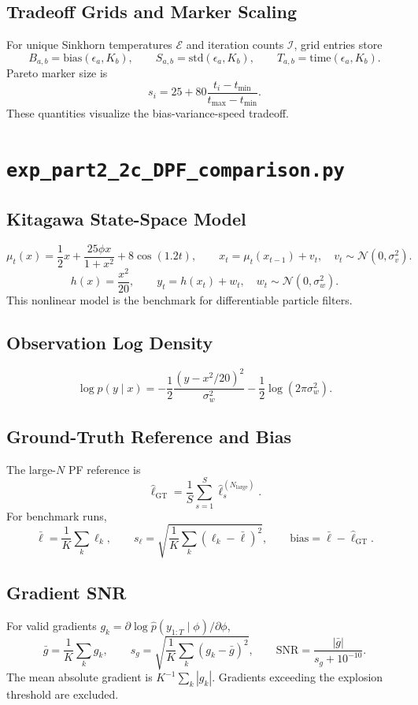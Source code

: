 \documentclass[11pt]{article}
\newcommand{\code}[1]{\texttt{#1}}
\begin{document}
\subsection*{Tradeoff Grids and Marker Scaling}
For unique Sinkhorn temperatures \(\mathcal E\) and iteration counts \(\mathcal I\), grid entries store
\[
B_{a,b}=\mathrm{bias}(\epsilon_a,K_b),\qquad
S_{a,b}=\mathrm{std}(\epsilon_a,K_b),\qquad
T_{a,b}=\mathrm{time}(\epsilon_a,K_b).
\]
Pareto marker size is
\[
s_i=25+80\frac{t_i-t_{\min}}{t_{\max}-t_{\min}}.
\]
These quantities visualize the bias-variance-speed tradeoff.

\section{\code{exp\_part2\_2c\_DPF\_comparison.py}}
\subsection*{Kitagawa State-Space Model}
\[
\mu_t(x)=\frac12x+\frac{25\phi x}{1+x^2}+8\cos(1.2t),
\qquad
x_t=\mu_t(x_{t-1})+v_t,\quad v_t\sim\mathcal N(0,\sigma_v^2).
\]
\[
h(x)=\frac{x^2}{20},\qquad
y_t=h(x_t)+w_t,\quad w_t\sim\mathcal N(0,\sigma_w^2).
\]
This nonlinear model is the benchmark for differentiable particle filters.

\subsection*{Observation Log Density}
\[
\log p(y\mid x)
=-\frac12\frac{(y-x^2/20)^2}{\sigma_w^2}
-\frac12\log(2\pi\sigma_w^2).
\]

\subsection*{Ground-Truth Reference and Bias}
The large-\(N\) PF reference is
\[
\hat\ell_{\mathrm{GT}}=\frac{1}{S}\sum_{s=1}^{S}\hat\ell_s^{(N_{\mathrm{large}})}.
\]
For benchmark runs,
\[
\bar\ell=\frac{1}{K}\sum_k\ell_k,\qquad
s_\ell=\sqrt{\frac{1}{K}\sum_k(\ell_k-\bar\ell)^2},\qquad
\mathrm{bias}=\bar\ell-\hat\ell_{\mathrm{GT}}.
\]

\subsection*{Gradient SNR}
For valid gradients \(g_k=\partial\log\hat p(y_{1:T}\mid\phi)/\partial\phi\),
\[
\bar g=\frac{1}{K}\sum_kg_k,\qquad
s_g=\sqrt{\frac{1}{K}\sum_k(g_k-\bar g)^2},\qquad
\mathrm{SNR}=\frac{|\bar g|}{s_g+10^{-10}}.
\]
The mean absolute gradient is \(K^{-1}\sum_k|g_k|\). Gradients exceeding the explosion threshold are excluded.
\end{document}
